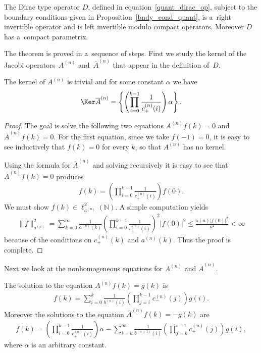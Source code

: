 \begin{theo}
\label{compact_para_quant}
The Dirac type operator $D$, defined in equation~\eqref{quant_dirac_op}, subject to the boundary conditions given in
Proposition~{\rm \ref{bndy_cond_quant}}, is a~right invertible operator and is left invertible modulo compact operators.
Moreover $D$ has a~compact parametrix.
\end{theo}

The theorem is proved in a~sequence of steps.
First we study the kernel of the Jacobi opera\-tors~${A}^{(n)}$ and~$\overline{A}^{(n)}$ that appear in the def\/inition of~$D$.
\begin{lem}
\label{A_and_A_bar_ker}
The kernel of $A^{(n)}$ is trivial and for some constant $\alpha$ we have
\begin{gather*}
\Ker \overline{A}^{(n)} = \left\{\left(\prod\limits_{i=0}^{k-1}\frac{1}{c_+^{(n)}(i)}\right)\alpha\right\}.
\end{gather*}
\end{lem}

\begin{proof}
The goal is solve the following two equations $A^{(n)}f(k) = 0$ and $\overline{A}^{(n)}f(k)=0$.
For the f\/irst equation, since we take $f(-1)=0$, it is easy to see inductively that $f(k)=0$ for every $k$, so that
$A^{(n)}$ has no kernel.

Using the formula for $\overline{A}^{(n)}$ and solving recursively it is easy to see that $\overline{A}^{(n)}f(k)=0$
produces
\begin{gather*}
f(k) = \left(\prod\limits_{i=0}^{k-1}\frac{1}{c_+^{(n)}(i)}\right)f(0).
\end{gather*}
We must show ${f(k)}\in \ell_{a^{(n)}}^2({\mathbb N})$.
A simple computation yields
\begin{gather*}
\|f\|_{a^{(n)}}^2 = \sum\limits_{k=0}^{\infty}
\frac{1}{a^{(n)}(k)}\left(\prod\limits_{i=0}^{k-1}\frac{1}{c_+^{(n)}(i)}\right)^2|f(0)|^2
\leq\frac{s(n)|f(0)|^2}{\kappa^2} < \infty
\end{gather*}
because of the conditions on $c_+^{(n)}(k)$ and $a^{(n)}(k)$.
Thus the proof is complete.
\end{proof}
Next we look at the nonhomogeneous equations for $A^{(n)}$ and $\overline{A}^{(n)}$.

\begin{lem}
\label{A_and_A_bar_gen_soln}
The solution to the equation $A^{(n)}f(k) = g(k)$ is
\begin{gather*}
f(k) = \sum\limits_{i=0}^k\frac{1}{b^{(n)}(i)}\left(\prod\limits_{j=i}^{k-1}c_-^{(n)}(j)\right)g(i).
\end{gather*}
Moreover the solutions to the equation $\overline{A}^{(n)}f(k) = -g(k)$ are
\begin{gather*}
f(k) = \left(\prod\limits_{i=0}^{k-1}\frac{1}{c_+^{(n)}(i)}\right)\alpha - \sum\limits_{i=k}^\infty
\frac{1}{b^{(n+1)}(i)}\left(\prod\limits_{j=k}^{i-1}c_+^{(n)}(j)\right)g(i),
\end{gather*}
where $\alpha$ is an arbitrary constant.
\end{lem}

